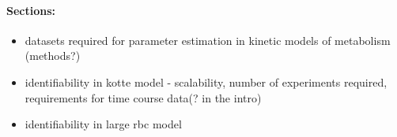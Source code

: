 \documentclass[10pt]{article}
\begin{document}
\paragraph{Sections:}
\begin{itemize}
	\item datasets required for parameter estimation in kinetic models of metabolism (methods?)		
	\item identifiability in kotte model - scalability, number of experiments required, requirements for time course data(? in the intro)		
	\item identifiability in large rbc model
\end{itemize}

\printbibliography
\end{document}
